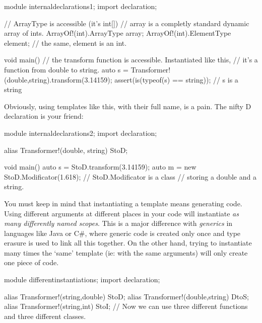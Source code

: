 \begin{dcode}
module internaldeclarations1;
import declaration;

// ArrayType is accessible (it's int[])
// array is a completly standard dynamic array of ints.
ArrayOf!(int).ArrayType array; 
ArrayOf!(int).ElementType element; // the same, element is an int.

void main()
{
    // the transform function is accessible. Instantiated like this, 
    // it's a function from double to string.
    auto s = Transformer!(double,string).transform(3.14159);
    assert(is(typeof(s) == string)); // s is a string
}
\end{dcode}

Obviously, using templates like this, with their full name, is a pain. The nifty D  declaration is your friend:

\begin{dcode}
module internaldeclarations2;
import declaration;

alias Transformer!(double, string) StoD;

void main()
{
    auto s = StoD.transform(3.14159);
    auto m = new StoD.Modificator(1.618); // StoD.Modificator is a class
                                          // storing a double and a string.
}
\end{dcode}

You must keep in mind that instantiating a template means generating code. Using different arguments at different places in your code will instantiate \emph{as many differently named scopes}. This is a major difference with \emph{generics} in languages like Java or C\#, where generic code is created only once and type erasure is used to link all this together. On the other hand, trying to instantiate many times the `same' template (ie: with the same arguments) will only create one piece of code.

\begin{dcode}
module differentinstantiations;
import declaration;

alias Transformer!(string,double) StoD;
alias Transformer!(double,string) DtoS;
alias Transformer!(string,int)    StoI;
// Now we can use three different functions and three different classes.
\end{dcode}


